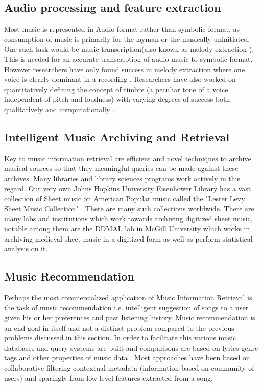 \subsection{Audio processing and feature extraction}

\noindent Most music is represented in Audio format rather than symbolic format, as consumption of music is primarily for the layman or the musically uninitiated. One such task would be music transcription(also known as melody extraction \cite{melextract}). This is needed for an accurate transcription of audio music to symbolic format. However researchers have only found success in melody extraction where one voice is clearly dominant in a recording \cite{melextract}. Researchers have also worked on quantitatively defining the concept of timbre (a peculiar tone of a voice independent of pitch and loudness) with varying degrees of success both qualitatively \cite{timbrequal} and computationally \cite{musiclisteningthesis}. 

\subsection{Intelligent Music Archiving and Retrieval}

\noindent Key to music information retrieval are efficient and novel techniques to archive musical sources so that they meaningful queries can be made against these archives. Many libraries and library sciences programs work actively in this regard. Our very own Johns Hopkins University Eisenhower Library has a vast collection of Sheet music on American Popular music called the "Lester Levy Sheet Music Collection" \cite{Levy:Collection:Online} . There are many such collections worldwide. There are many labs and institutions which work towards archiving digitized sheet music, notable among them are the DDMAL lab in McGill University \cite{DDMAL} which works in archiving medieval sheet music in a digitized form as well as perform statistical analysis on it. 

\subsection{Music Recommendation}

\noindent Perhaps the most commercialized application of Music Information Retrieval is the task of music recommendation i.e. intelligent suggestion of songs to a user given his or her preferences and past listening history. Music recommendation is an end goal in itself and not a distinct problem compared to the previous problems discussed in this section. In order to facilitate this various music databases and query systems are built and comparisons are based on lyrics genre tags and other properties of music data \cite{musicrecSurvey}. Most approaches have been based on collaborative filtering contextual metadata (information based on community of users) and sparingly from low level features extracted from a song. 



